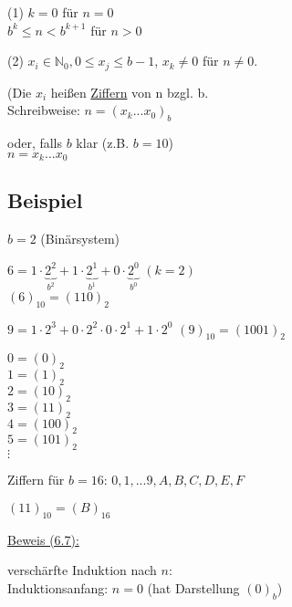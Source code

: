 \documentclass[a4paper, 12pt, twoside] {article}
\begin{document}
(1) $k = 0$ für $n = 0$ \\
$b^k \leq n < b^{k+1}$ für $n > 0$

(2) $x_i \in \mathbb{N}_0, 0 \leq x_j \leq b -1$,
$x_k \neq 0$ für $n \neq 0$.

(Die $x_i$ heißen \underline{Ziffern} von n bzgl. b. \\
Schreibweise: $n= (x_k ... x_0)_b$

oder, falls $b$ klar (z.B. $b = 10$) \\
$n = x_k...x_0$

\subsection{Beispiel} %
$b = 2$ (Binärsystem)

$6 = 1 \cdot \underbrace{2^2}_{b^2} + 1 \cdot \underbrace{2^1}_{b^1} + 0 \cdot \underbrace{2^0}_{b^0}$ $(k = 2)$ \\
$(6)_{10} = (110)_2$

$9 = 1 \cdot 2^3 + 0 \cdot 2^2  \cdot  0 \cdot 2^1 + 1 \cdot 2^0$
$(9)_{10} = (1001)_2$

$0 = (0)_2$ \\
$1 = (1)_2$ \\
$2 = (10)_2$ \\
$3 = (11)_2$ \\
$4 = (100)_2$ \\
$5 = (101)_2$ \\
$\vdots$

Ziffern für $b=16$:
$0, 1, ...9, A, B, C, D, E, F$

$(11)_{10} = (B)_{16}$

\underline{Beweis (6.7):}

verschärfte Induktion nach $n$: \\
Induktionsanfang: $n = 0$ (hat Darstellung $(0)_b$)
\end{document}
